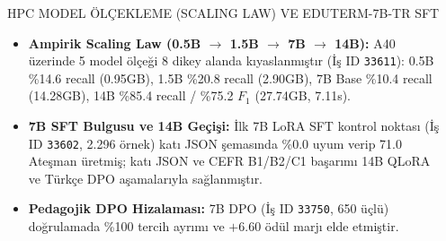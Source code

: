 \documentclass[final]{beamer}
\newlength{\sepwidth}
\newlength{\colwidth}
\newcommand{\separatorcolumn}{\begin{column}{\sepwidth}\end{column}}
\begin{document}
\begin{frame}[t]
\begin{columns}[t,totalwidth=0.98\paperwidth]

\separatorcolumn

\begin{column}{\colwidth}

  \begin{block}{HPC MODEL ÖLÇEKLEME (SCALING LAW) VE EDUTERM-7B-TR SFT}
    \begin{itemize}
      \item \textbf{Ampirik Scaling Law (0.5B $\to$ 1.5B $\to$ 7B $\to$ 14B):} A40 üzerinde 5 model ölçeği 8 dikey alanda kıyaslanmıştır (İş ID \texttt{33611}): 0.5B \%14.6 recall (0.95GB), 1.5B \%20.8 recall (2.90GB), 7B Base \%10.4 recall (14.28GB), 14B \%85.4 recall / \%75.2 $F_1$ (27.74GB, 7.11s).
      \item \textbf{7B SFT Bulgusu ve 14B Geçişi:} İlk 7B LoRA SFT kontrol noktası (İş ID \texttt{33602}, 2.296 örnek) katı JSON şemasında \%0.0 uyum verip 71.0 Ateşman üretmiş; katı JSON ve CEFR B1/B2/C1 başarımı 14B QLoRA ve Türkçe DPO aşamalarıyla sağlanmıştır.
      \item \textbf{Pedagojik DPO Hizalaması:} 7B DPO (İş ID \texttt{33750}, 650 üçlü) doğrulamada \%100 tercih ayrımı ve $+6.60$ ödül marjı elde etmiştir.
    \end{itemize}


\end{block}
\end{column}
\end{columns}
\end{frame}
\end{document}
